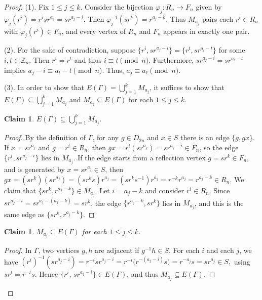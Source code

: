 \documentclass[12pt,reqno,a4paper]{amsart}
\theoremstyle{definition}
\newtheorem{claim}[defn]{Claim}
\begin{document}
\begin{proof}
(1).
Fix $1\leq j\leq k$. Consider the bijection
$\varphi_j : R_{n} \to F_{n}$ given by $\varphi_j(r^i) = r^{i}sr^{a_{j}} = sr^{a_j-i}$.    
Then $\varphi_j^{-1}(sr^k) = r^{a_j-k}$.
Thus $M_{a_j}$ pairs each $r^i \in R_{n}$ with $\varphi_j(r^i) \in F_{n}$, and every vertex of $R_{n}$ and $F_{n}$ appears in exactly one pair. 

(2). For the sake of contradiction, suppose $\{r^i,sr^{a_j-i}\}=\{r^t,sr^{a_l-t}\}$ for some $i,t\in \mathbb{Z}_{n}$.
Then $r^i=r^t$ and thus $i\equiv t\pmod n$. 
Furthermore, 
$sr^{a_j-i}=sr^{a_l-t}$ implies $a_{j}-i\equiv a_{l}-t \pmod n$.
Thus, $a_j\equiv a_\ell\pmod n$. 

(3). 
In order to show that $E(\Gamma) = \bigcup_{j=1}^k M_{a_j}$, it suffices to show that $E(\Gamma) \subseteq \bigcup_{j=1}^k M_{a_j}$ and $M_{a_j}\subseteq E(\Gamma)$ for each $1\leq j\leq k$.

\begin{claim}\label{Claim 4.3}
{\em $E(\Gamma) \subseteq \bigcup_{j=1}^k M_{a_j}$.}
\end{claim}

\begin{proof}
By the definition of $\Gamma$, for any $g \in D_{2n}$ and $x \in S$ there is an edge $\{ g, gx \}$.  
If $x = sr^{a_j}$ and $g = r^i \in R_{n}$, then
$gx = r^i (sr^{a_j}) = sr^{a_j-i} \in F_{n}$,
so the edge $\{ r^i, sr^{a_j-i}\}$ lies in $M_{a_j}$.  
If the edge starts from a reflection vertex $g=sr^{k}\in F_{n}$, and is generated by $x=sr^{a_{j}}\in S$, then $gx=(sr^{k})(sr^{a_{j}})=(sr^{k}s)r^{a_{j}}=(sr^{k}s^{-1})r^{a_{j}}=r^{-k}r^{a_{j}} =r^{a_{j}-k}\in R_{n}$.
We claim that $\{sr^{k},r^{a_{j}-k}\}\in M_{a_{j}}$.
Let \(i=a_{j}-k\) and consider $r^{i}\in R_{n}$. Since $sr^{a_{j}-i}=sr^{a_{j}-(a_{j}-k)}=sr^{k}$, the edge $\{r^{a_{j}-k},sr^{k}\}$ lies in $M_{a_{j}}$, and this is the same edge as $\{sr^{k},r^{a_{j}-k}\}$. 
 \end{proof}

\begin{claim}\label{Claim 4.4}
{\em $M_{a_j}\subseteq E(\Gamma)$ for each $1\leq j\leq k$}.    
\end{claim}

\begin{proof}
In $\Gamma$, two vertices $g,h$ are adjacent
if $g^{-1}h\in S$.  
For each $i$ and each $j$, we have
$
(r^i)^{-1}(s r^{a_j-i})=r^{-i}s r^{a_j-i}
= r^{-i}\bigl(r^{-(a_j-i)}s\bigr)=r^{-a_j}s=s r^{a_j}\in S,
$
using $s r^t=r^{-t}s$. 
Hence $\{r^{i},\, sr^{a_j-i}\}\in E(\Gamma)$, and thus $M_{a_j}\subseteq E(\Gamma)$.
 \end{proof}


\end{proof}
\end{document}
